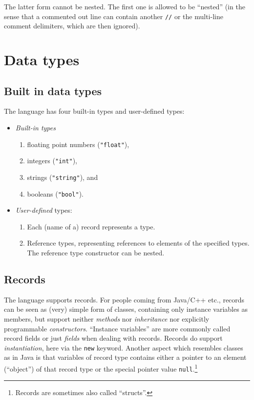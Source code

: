 \documentclass[11pt]{article}
\begin{document}
The latter form cannot be nested. The first one is allowed to be ``nested''
(in the sense that a commented out line can contain another \texttt{//} or the
multi-line comment delimiters, which are then ignored).

\section{Data types}
\label{sec:org97b3710}

\subsection{Built in data types}
\label{sec:orgf5a6427}

The language has four built-in types and user-defined types:

\begin{itemize}
\item \emph{Built-in types} 
\begin{enumerate}
\item floating point numbers (\texttt{"float"}),
\item integers (\texttt{"int"}),
\item strings  (\texttt{"string"}), and
\item booleans (\texttt{"bool"}).
\end{enumerate}

\item \emph{User-defined} types: 
\begin{enumerate}
\item Each (name of a) record represents a type.
\item Reference types, representing references to elements 
of the specified types. The reference type constructor
can be nested.
\end{enumerate}
\end{itemize}


\subsection{Records}
\label{sec:org0f71bb8}

The language supports records. For people coming from Java/C++ etc.,
records can be seen as (very) simple form of classes, containing only
instance variables as members, but support neither \emph{methods} nor
\emph{inheritance} nor explicitly programmable \emph{constructors}. ``Instance
variables'' are more commonly called record fields or just \emph{fields} when
dealing with records. Records do support \emph{instantiation}, here via the
\texttt{new} keyword. Another aspect which resembles classes as in Java is that
variables of record type contains either a pointer to an element
(``object'') of that record type or the special pointer value
\texttt{null}.\footnote{Records are sometimes also called ``structs''.}
\end{document}

